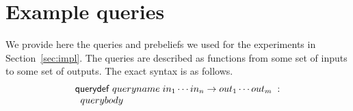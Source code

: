 %
%
%
%
%
\vspace*{.1in}
\section{Example queries} \label{appendix:queries}

%

We provide here the queries and prebeliefs we used for the experiments
in Section~\ref{sec:impl}. The queries are described as functions
from some set of inputs to some set of outputs. The exact syntax is as
follows.
$$
\begin{array}{l}
\mathsf{querydef} \; queryname \; in_1 \cdots in_n \rightarrow out_1 \cdots out_m \; : \\
\;\; querybody \\
\end{array}
$$

